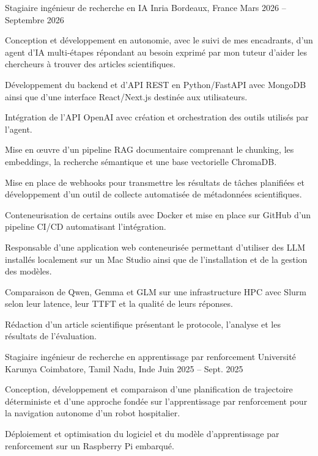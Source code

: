 
\begin{cventries}
  \cventry
    {Stagiaire ingénieur de recherche en IA}
    {Inria}
    {Bordeaux, France}
    {Mars 2026 -- Septembre 2026}
    {
      \begin{cvitems}
        \item {Conception et développement en autonomie, avec le suivi de mes encadrants, d’un agent d’IA multi-étapes répondant au besoin exprimé par mon tuteur d’aider les chercheurs à trouver des articles scientifiques.}
        \item {Développement du backend et d’API REST en Python/FastAPI avec MongoDB ainsi que d’une interface React/Next.js destinée aux utilisateurs.}
        \item {Intégration de l’API OpenAI avec création et orchestration des outils utilisés par l’agent.}
        \item {Mise en œuvre d’un pipeline RAG documentaire comprenant le chunking, les embeddings, la recherche sémantique et une base vectorielle ChromaDB.}
        \item {Mise en place de webhooks pour transmettre les résultats de tâches planifiées et développement d’un outil de collecte automatisée de métadonnées scientifiques.}
        \item {Conteneurisation de certains outils avec Docker et mise en place sur GitHub d’un pipeline CI/CD automatisant l’intégration.}
        \item {Responsable d’une application web conteneurisée permettant d’utiliser des LLM installés localement sur un Mac Studio ainsi que de l’installation et de la gestion des modèles.}
        \item {Comparaison de Qwen, Gemma et GLM sur une infrastructure HPC avec Slurm selon leur latence, leur TTFT et la qualité de leurs réponses.}
        \item {Rédaction d’un article scientifique présentant le protocole, l’analyse et les résultats de l’évaluation.}
      \end{cvitems}
    }

  \cventry
    {Stagiaire ingénieur de recherche en apprentissage par renforcement}
    {Université Karunya}
    {Coimbatore, Tamil Nadu, Inde}
    {Juin 2025 -- Sept. 2025}
    {
      \begin{cvitems}
        \item {Conception, développement et comparaison d’une planification de trajectoire déterministe et d’une approche fondée sur l’apprentissage par renforcement pour la navigation autonome d’un robot hospitalier.}
        \item {Déploiement et optimisation du logiciel et du modèle d’apprentissage par renforcement sur un Raspberry Pi embarqué.}
      \end{cvitems}
    }
\end{cventries}

